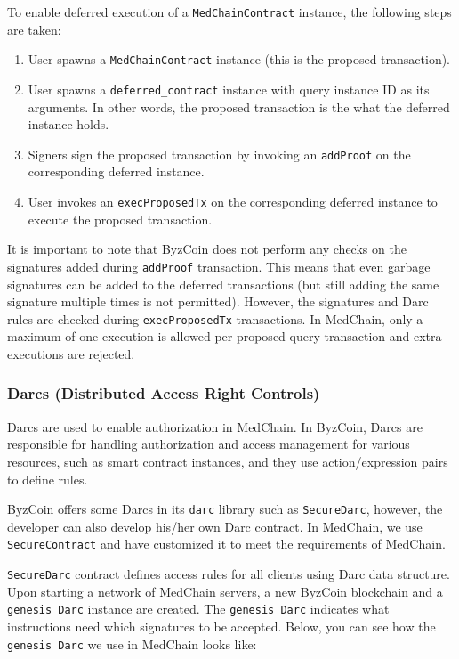 To enable deferred execution of a \texttt{MedChainContract} instance, the following steps are taken:
\begin{enumerate}
    \item User spawns a \texttt{MedChainContract} instance (this is the proposed transaction).
    \item User spawns a \texttt{deferred\_contract} instance with query instance ID as its arguments. In other words, the proposed transaction is the what the deferred instance holds.
    \item Signers sign the proposed transaction by invoking an \texttt{addProof} on the corresponding deferred instance.
    \item User invokes an \texttt{execProposedTx} on the corresponding deferred instance to execute the proposed transaction.
\end{enumerate}

It is important to note that ByzCoin does not perform any checks on the signatures added during \texttt{addProof} transaction. This means that even garbage signatures can be added to the deferred transactions (but still adding the same signature multiple times is not permitted). However, the signatures and Darc rules are checked during \texttt{execProposedTx} transactions. In MedChain, only a maximum of one execution is allowed per proposed query transaction and extra executions are rejected. 

\subsubsection{Darcs (Distributed Access Right Controls)} \label{lbl:darcs}
Darcs are used to enable authorization in MedChain. In ByzCoin, Darcs are responsible for handling authorization and access management for various resources, such as smart contract instances, and they use action/expression pairs to define rules.

ByzCoin offers some Darcs in its \texttt{darc} library such as \texttt{SecureDarc}, however, the developer can also develop his/her own Darc contract. In MedChain, we use \texttt{SecureContract} and have customized it to meet the requirements of MedChain. 

\texttt{SecureDarc} contract defines access rules for all clients using Darc data structure. Upon starting a network of MedChain servers, a new ByzCoin blockchain and a \texttt{genesis Darc} instance are created. The \texttt{genesis Darc} indicates what instructions need which signatures to be accepted. Below, you can see how the \texttt{genesis Darc} we use in MedChain looks like:

